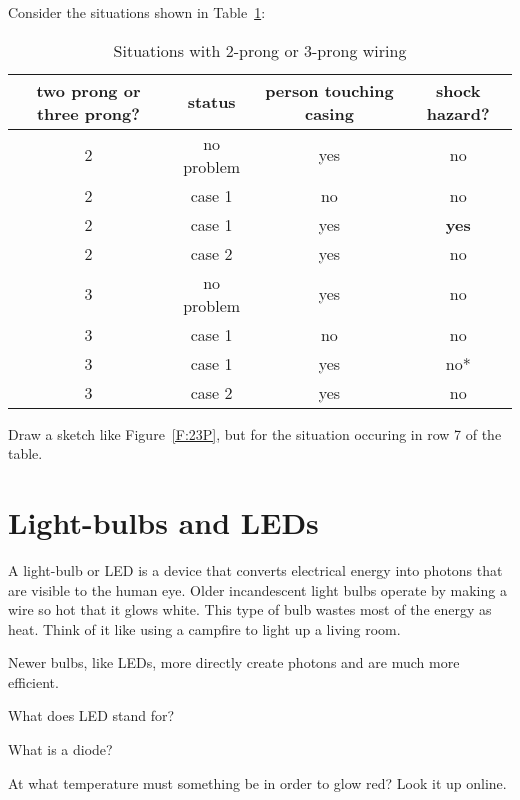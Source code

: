 Consider the situations shown in Table~\ref{T:2P3}:\par
\begin{table}[H]
\begin{center}
\begin{tabular}{c|c|c|c}
two prong or three prong?&status&person touching casing&shock hazard?\\ \hline
2	&	no problem	& yes	& no\\ \hline
2	&	case 1		& no	& no\\ \hline
2	&	case 1		& yes	& \textbf{yes}\\ \hline
2	&	case 2		& yes	& no\\ \hline
3	&	no problem	& yes	& no\\ \hline
3	&	case 1		& no	& no\\ \hline
3	&	case 1		& yes	& no*\\ \hline
3	&	case 2		& yes	& no\\ \hline
\end{tabular}\par
\caption{Situations with 2-prong or 3-prong wiring}
\label{T:2P3}
\end{center}
\end{table}

\begin{blevel}
Draw a sketch like Figure~\ref{F:23P}, but for the situation occuring in row 7 of the table.
\end{blevel}
\section{Light-bulbs and LEDs}
A light-bulb or LED is a device that converts electrical energy into photons that are visible to the human eye. Older incandescent light bulbs operate by making a wire so hot that it glows white. This type of bulb wastes most of the energy as heat. Think of it like using a campfire to light up a living room.\par
Newer bulbs, like LEDs, more directly create photons and are much more efficient.

\begin{alevel}
What does LED stand for?
\end{alevel}

\begin{blevel}
What is a diode?
\end{blevel}

\begin{alevel}
At what temperature must something be in order to glow red? Look it up online.
\end{alevel}

